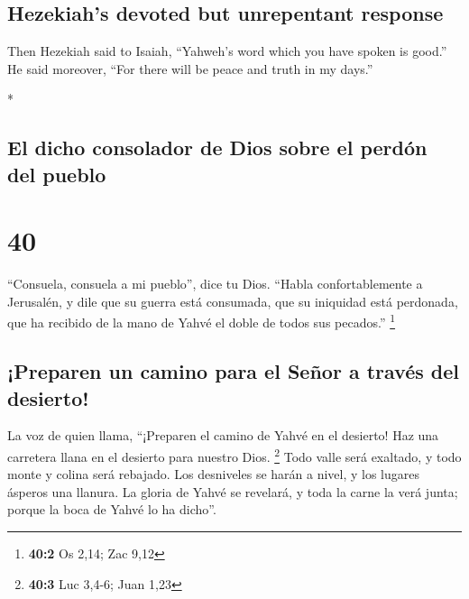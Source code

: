 \begin{paracol}{2}
\begin{otherlanguage}{english}
\hypertarget{hezekiahs-devoted-but-unrepentant-response}{%
\subsection{Hezekiah's devoted but unrepentant
response}\label{hezekiahs-devoted-but-unrepentant-response}}

 Then Hezekiah said to Isaiah, ``Yahweh's word which you
have spoken is good.'' He said moreover, ``For there will be peace and
truth in my days.''

\end{otherlanguage}

\switchcolumn[0]*

\hypertarget{el-dicho-consolador-de-dios-sobre-el-perduxf3n-del-pueblo}{%
\subsection{El dicho consolador de Dios sobre el perdón del
pueblo}\label{el-dicho-consolador-de-dios-sobre-el-perduxf3n-del-pueblo}}

\hypertarget{section-78}{%
\section{40}\label{section-78}}

 ``Consuela, consuela a mi pueblo'', dice tu Dios.
 ``Habla confortablemente a Jerusalén, y dile que su
guerra está consumada, que su iniquidad está perdonada, que ha recibido
de la mano de Yahvé el doble de todos sus pecados.'' \footnote{\textbf{40:2}
  Os 2,14; Zac 9,12}

\hypertarget{preparen-un-camino-para-el-seuxf1or-a-travuxe9s-del-desierto}{%
\subsection{¡Preparen un camino para el Señor a través del
desierto!}\label{preparen-un-camino-para-el-seuxf1or-a-travuxe9s-del-desierto}}

 La voz de quien llama, ``¡Preparen el camino de Yahvé en
el desierto! Haz una carretera llana en el desierto para nuestro Dios.
\footnote{\textbf{40:3} Luc 3,4-6; Juan 1,23}  Todo valle
será exaltado, y todo monte y colina será rebajado. Los desniveles se
harán a nivel, y los lugares ásperos una llanura.  La
gloria de Yahvé se revelará, y toda la carne la verá junta; porque la
boca de Yahvé lo ha dicho''.


\end{paracol}
